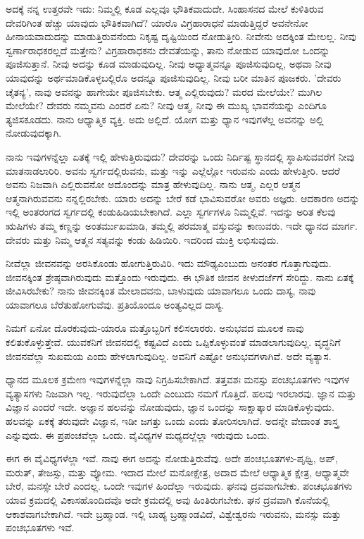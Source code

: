 ಅದಕ್ಕೆ ನನ್ನ ಉತ್ತರವೇ ಇದು: ನಿಮ್ಮಲ್ಲಿ ಕೂಡ ಎಲ್ಲವೂ ಭೌತಿಕವಾದುದೇ. ಸಿಂಹಾಸನದ ಮೇಲೆ ಕುಳಿತಿರುವ ದೇವರಿಗಿಂತ ಹೆಚ್ಚು ಯಾವುದು ಭೌತಿಕವಾಗಿದೆ? ಯಾರೊ ವಿಗ್ರಹಾರಾಧನೆ ಮಾಡುತ್ತಿದ್ದರೆ ಅವನೇನೋ ಹೀನಾಯವಾದುದನ್ನು ಮಾಡುತ್ತಿರುವನೆಂದು ನಿಕೃಷ್ಟ ದೃಷ್ಟಿಯಿಂದ ನೋಡುತ್ತೀರಿ. ನೀವೇನು ಅದಕ್ಕಿಂತ ಮೇಲಲ್ಲ. ನೀವು ಸ್ವರ್ಣಾರಾಧಕರಲ್ಲದೆ ಮತ್ತೇನು? ವಿಗ್ರಹಾರಾಧಕನು ದೇವತೆಯನ್ನು, ತಾನು ನೋಡುವ ಯಾವುದೋ ಒಂದನ್ನು ಪೂಜಿಸುತ್ತಾನೆ. ನೀವು ಅದನ್ನು ಕೂಡ ಮಾಡುವುದಿಲ್ಲ. ನೀವು ಅಧ್ಯಾತ್ಮವನ್ನೂ ಪೂಜಿಸುವುದಿಲ್ಲ, ಅಥವಾ ನೀವು ಯಾವುದನ್ನು ಅರ್ಥಮಾಡಿಕೊಳ್ಳಬಲ್ಲಿರೊ ಅದನ್ನೂ ಪೂಜಿಸುವುದಿಲ್ಲ. ನೀವು ಬರೀ ಮಾತಿನ ಪೂಜಕರು. 'ದೇವರು ಚೈತನ್ಯ', ನಾವು ಅವನನ್ನು ಹಾಗೇಯೇ ಪೂಜಿಸಬೇಕು. ಆತ್ಮ ಎಲ್ಲಿರುವುದು? ಮರದ ಮೇಲೆಯೇ? ಮುಗಿಲ ಮೇಲೆಯೇ? ದೇವರು ನಮ್ಮವನು ಎಂದರೆ ಏನು? ನೀವು ಆತ್ಮ, ನೀವು ಈ ಮುಖ್ಯ ಭಾವನೆಯನ್ನು ಎಂದಿಗೂ ತ್ಯಜಿಸಕೂಡದು. ನಾನು ಆಧ್ಯಾತ್ಮಿಕ ವ್ಯಕ್ತಿ. ಅದು ಅಲ್ಲಿದೆ. ಯೋಗ ಮತ್ತು ಧ್ಯಾನ ಇವುಗಳೆಲ್ಲ ಅವನನ್ನು ಅಲ್ಲಿ ನೋಡುವುದಕ್ಕಾಗಿ.

ನಾನು ಇವುಗಳನ್ನೆಲ್ಲಾ ಏತಕ್ಕೆ ಇಲ್ಲಿ ಹೇಳುತ್ತಿರುವುದು? ದೇವರನ್ನು ಒಂದು ನಿರ್ದಿಷ್ಟ ಸ್ಥಾನದಲ್ಲಿ ಸ್ಥಾಪಿಸುವವರೆಗೆ ನೀವು ಮಾತನಾಡಲಾರಿರಿ. ಅವನು ಸ್ವರ್ಗದಲ್ಲಿರುವನು, ಮತ್ತು ಇನ್ನು ಎಲ್ಲೆಲ್ಲೋ ಇರುವನು ಎಂದು ಹೇಳುತ್ತೀರಿ. ಆದರೆ ಅವನು ನಿಜವಾಗಿ ಎಲ್ಲಿರುವನೋ ಅದೊಂದನ್ನು ಮಾತ್ರ ಹೇಳುವುದಿಲ್ಲ. ನಾನು ಆತ್ಮ, ಎಲ್ಲರ ಆತ್ಮನ ಆತ್ಮನಾಗಿರುವವನು ನನ್ನಲ್ಲಿರಬೇಕು. ಯಾರು ಅದನ್ನು ಬೇರೆ ಕಡೆ ಭಾವಿಸುವರೋ ಅವರು ಅಜ್ಞರು. ಆದಕಾರಣ ಅದನ್ನು ಇಲ್ಲಿ ಅಂತರಂಗದ ಸ್ವರ್ಗದಲ್ಲಿ ಕಂಡುಹಿಡಿಯಬೇಕಾಗಿದೆ. ಎಲ್ಲಾ ಸ್ವರ್ಗಗಳೂ ನಿಮ್ಮಲ್ಲಿವೆ. ಇದನ್ನು ಅರಿತ ಕೆಲವು ಋಷಿಗಳು ತಮ್ಮ ಕಣ್ಣನ್ನು ಅಂತರ್ಮುಖಮಾಡಿ, ತಮ್ಮಲ್ಲಿ ಪರಮಾತ್ಮ ವಸ್ತುವನ್ನು ಕಾಣುವರು. ಇದೇ ಧ್ಯಾನದ ಮಾರ್ಗ. ದೇವರು ಮತ್ತು ನಿಮ್ಮ ಆತ್ಮನ ಸತ್ಯವನ್ನು ಕಂಡು ಹಿಡಿಯಿರಿ. ಇದರಿಂದ ಮುಕ್ತಿ ಲಭಿಸುವುದು.

ನೀವೆಲ್ಲಾ ಜೀವನವನ್ನು ಅರಸಿಕೊಂಡು ಹೋಗುತ್ತಿರುವಿರಿ. ಇದು ಮೌಢ್ಯ\break ಎಂಬುದು ಅನಂತರ ಗೊತ್ತಾಗುವುದು. ಜೀವನಕ್ಕಿಂತ ಶ್ರೇಷ್ಠವಾಗಿರುವುದು ಮತ್ತೊಂದು ಇರುವುದು. ಈ ಭೌತಿಕ ಜೀವನ ಕೀಳುದರ್ಜೆಗೆ ಸೇರಿದ್ದು. ನಾನು ಏತಕ್ಕೆ ಜೀವಿಸಿರಬೇಕು? ನಾನು ಜೀವನಕ್ಕಿಂತ ಮೇಲಾದವನು, ಬಾಳುವುದು ಯಾವಾಗಲೂ ಒಂದು ದಾಸ್ಯ, ನಾವು ಯಾವಾಗಲೂ ಬೆರೆತುಹೋಗುವೆವು. ಪ್ರತಿಯೊಂದೂ ಅಂತ್ಯವಿಲ್ಲದ ದಾಸ್ಯ.

ನಿಮಗೆ ಏನೋ ದೊರಕುವುದು-ಯಾರೂ ಮತ್ತೊಬ್ಬರಿಗೆ ಕಲಿಸಲಾರರು. ಅನುಭವದ ಮೂಲಕ ನಾವು ಕಲಿತುಕೊಳ್ಳುತ್ತೇವೆ. ಯುವಕನಿಗೆ ಜೀವನದಲ್ಲಿ ಕಷ್ಟವಿದೆ ಎಂದು ಒಪ್ಪಿಕೊಳ್ಳುವಂತೆ ಮಾಡಲಾಗುವುದಿಲ್ಲ. ವೃದ್ಧನಿಗೆ ಜೀವನವೆಲ್ಲಾ ಸುಖಮಯ ಎಂದು ಹೇಳಲಾಗುವುದಿಲ್ಲ. ಅವನಿಗೆ ಎಷ್ಟೋ ಅನುಭವಗಳಾಗಿವೆ. ಅದೇ ವ್ಯತ್ಯಾಸ.

ಧ್ಯಾನದ ಮೂಲಕ ಕ್ರಮೇಣ ಇವುಗಳನ್ನೆಲ್ಲಾ ನಾವು ನಿಗ್ರಹಿಸಬೇಕಾಗಿದೆ. ತತ್ತವಶಃ ಮನಸ್ಸು ಪಂಚಭೂತಗಳು ಇವುಗಳ ವ್ಯತ್ಯಾಸಗಳು ನಿಜವಾಗಿ ಇಲ್ಲ. ಇರುವುದೆಲ್ಲಾ ಒಂದೇ ಎಂಬುದು ನಮಗೆ ಗೊತ್ತಿದೆ. ಹಲವು ಇರಲಾರವು. ಜ್ಞಾನ ಮತ್ತು ವಿಜ್ಞಾನ ಎಂದರೆ ಇದೇ. ಅಜ್ಞಾನ ಹಲವನ್ನು ನೋಡುವುದು, ಜ್ಞಾನ ಒಂದನ್ನು ಸಾಕ್ಷಾತ್ಕಾರ ಮಾಡಿಕೊಳ್ಳುವುದು. ಹಲವನ್ನು ಏಕಕ್ಕೆ ತರುವುದೇ ವಿಜ್ಞಾನ, ಇಡೀ ಜಗತ್ತು ಒಂದು ಎಂದು ತೋರಿಸಲಾಗಿದೆ. ಅದನ್ನೇ ವೇದಾಂತ ಶಾಸ್ತ್ರ ಎನ್ನುವುದು. ಈ ಪ್ರಪಂಚವೆಲ್ಲಾ ಒಂದು. ವೈವಿಧ್ಯಗಳ ಮಧ್ಯದಲ್ಲೆಲ್ಲಾ ಇರುವುದು ಒಂದು.

ಈಗ ಈ ವೈವಿಧ್ಯಗಳೆಲ್ಲಾ ಇವೆ. ನಾವು ಈಗ ಅದನ್ನು ನೋಡುತ್ತಿರುವೆವು. ಅದೇ ಪಂಚಭೂತಗಳು-ಪೃಥ್ವಿ, ಅಪ್, ಮರುತ್, ತೇಜಸ್ಸು, ಮತ್ತು ವ್ಯೋಮ. ಇದಾದ ಮೇಲೆ ಮನೋಕ್ಷೇತ್ರ, ಅದಾದ ಮೇಲೆ ಆಧ್ಯಾತ್ಮಿಕ ಕ್ಷೇತ್ರ, ಆಧ್ಯಾತ್ಮವೇ ಬೇರೆ, ಮನಸ್ಸೇ ಬೇರೆ ಎಂದಲ್ಲ. ಒಂದೇ ಇವುಗಳ ಹಿಂದೆಲ್ಲಾ ಇರುವುದು. ಘನವು ದ್ರವವಾಗಬೇಕು. ಪಂಚಭೂತಗಳು ಯಾವ ಕ್ರಮದಲ್ಲಿ ವಿಕಾಸಹೊಂದಿದವೊ ಅದೇ ಕ್ರಮದಲ್ಲಿ ಅವು ಹಿಂತಿರುಗಬೇಕು. ಘನ ದ್ರವವಾಗಿ ಕೊನೆಯಲ್ಲಿ ಆಕಾಶವಾಗಬೇಕಾಗಿದೆ. ಇದೇ ಬ್ರಹ್ಮಾಂಡ. ಇಲ್ಲಿ ಬಾಹ್ಯ ಬ್ರಹ್ಮಾಂಡವಿದೆ, ವಿಶ್ವೇಶ್ವರನು ಇರುವನು, ಮನಸ್ಸು ಮತ್ತು ಪಂಚಭೂತಗಳು ಇವೆ.

